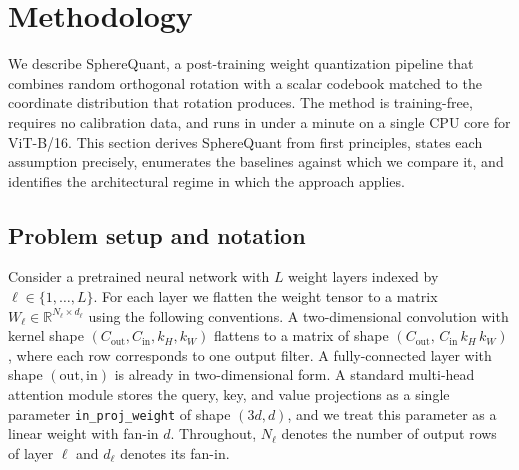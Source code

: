 %

\section{Methodology}
\label{sec:method}

We describe SphereQuant, a post-training weight quantization pipeline that combines
random orthogonal rotation with a scalar codebook matched to the coordinate
distribution that rotation produces. The method is training-free, requires no
calibration data, and runs in under a minute on a single CPU core for
ViT-B/16. This section derives SphereQuant from first principles, states each
assumption precisely, enumerates the baselines against which we compare it,
and identifies the architectural regime in which the approach applies.

\subsection{Problem setup and notation}
\label{sec:method-setup}

Consider a pretrained neural network with $L$ weight layers indexed by
$\ell \in \{1, \ldots, L\}$. For each layer we flatten the weight tensor to a
matrix $W_\ell \in \mathbb{R}^{N_\ell \times d_\ell}$ using the following
conventions. A two-dimensional convolution with kernel shape
$(C_\text{out}, C_\text{in}, k_H, k_W)$ flattens to a matrix of shape
$(C_\text{out},\, C_\text{in}\, k_H\, k_W)$, where each row corresponds to
one output filter. A fully-connected layer with shape
$(\text{out}, \text{in})$ is already in two-dimensional form. A standard
multi-head attention module stores the query, key, and value projections as
a single parameter \texttt{in\_proj\_weight} of shape $(3d, d)$, and we
treat this parameter as a linear weight with fan-in $d$. Throughout,
$N_\ell$ denotes the number of output rows of layer $\ell$ and $d_\ell$
denotes its fan-in.

